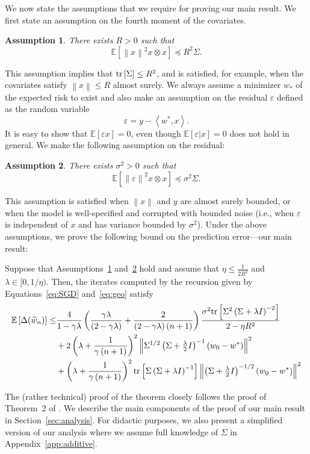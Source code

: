 \documentclass[final,12pt]{colt2018} %
\newtheorem{assumption}{Assumption}
\newcommand{\trace}[1]{\mbox{\normalfont tr}\left[#1\right]}
\newcommand{\EE}[1]{\mathbb{E}\left[#1\right]}
\newcommand{\EEcc}[2]{\mathbb{E}\left[\left.#1\right|#2\right]}
\newcommand{\norm}[1]{\left\|#1\right\|}
\newcommand{\pa}[1]{\left(#1\right)}
\newcommand{\wt}{\widetilde}
\newcommand{\tw}{\wt{w}}
\newcommand{\iprod}[2]{\left\langle#1, #2\right\rangle}
\begin{document}
We now state the assumptions that we require for proving our main result. We first state an assumption on the fourth moment of the 
covariates.
\begin{assumption}\label{ass:cov}
 There exists $R>0$ such that
 \[
  \EE{\norm{x}^2 x \otimes x} \preccurlyeq R^2\Sigma.
 \]
\end{assumption}
This assumption implies that $\trace{\Sigma} \le R^2$, and is satisfied, for example, when the covariates satisfy 
$\norm{x}\le R$ almost surely. We always assume a minimizer $w_*$ of the expected risk  to exist and  also make an assumption on the 
residual $\varepsilon$ defined as the random variable
\[
 \varepsilon = y - \iprod{w^*}{x}.
\]
It is easy to show that $\EE{\varepsilon x} = 0$, even though $\EEcc{\varepsilon}{x}=0$ does not hold in general. We make the following 
assumption on the residual:
\begin{assumption}\label{ass:res}
 There exists $\sigma^2>0$ such that
 \[
  \EE{\norm{\varepsilon}^2 x \otimes x} \preccurlyeq \sigma^2 \Sigma.
 \]
\end{assumption}
This assumption is satisfied when $\norm{x}$ and $y$ are almost surely bounded, or when the model is well-specified and corrupted with 
bounded noise (i.e., when $\varepsilon$ is independent of $x$ and has variance bounded by $\sigma^2$).
Under the above assumptions, we prove the following bound on the prediction error---our main result:
\begin{theorem}\label{thm:main}
Suppose that Assumptions~\ref{ass:cov} and~\ref{ass:res} hold and  assume that $\eta\le \frac{1}{2R^2}$ and $\lambda \in [0,1/\eta)$. Then, 
the iterates computed by the recursion given by Equations~\eqref{eq:SGD} 
and~\eqref{eq:geo} satisfy
\begin{align*}
\EE{\Delta(\tw_n)}
 \le & \frac{4}{1-\gamma\lambda} \pa{\frac{\gamma\lambda}{\pa{2-\gamma\lambda}} +
\frac{2}{\pa{2-\gamma\lambda}\pa{n+1}}} \frac{\sigma^2\trace{\Sigma^2 \pa{\Sigma + 
\lambda I}^{-2}}}{2 - \eta R^2}
\\
&+2\pa{\lambda + \frac{1}{\gamma\pa{n+1}}}^2  \norm{ \Sigma^{1/2} \pa{\Sigma + \textstyle{\frac \lambda 2}I}^{-1} \pa{w_0 - w^*}}^2
\\
&  + \pa{\lambda + \frac{1}{\gamma\pa{n+1}}}^2 \trace{\Sigma \pa{\Sigma + \lambda I}^{-1}}\norm{\pa{\Sigma + \textstyle{\frac{\lambda}{2}}
I}^{-1/2}\pa{w_0 - w^*}}^2 
\end{align*} 
\end{theorem}
The (rather technical) proof of the theorem closely follows the proof of Theorem~2 of \citet{DFB16}. We describe the main components of the 
proof of our main result in Section~\ref{sec:analysis}.  For didactic purposes, we also present a simplified version of our analysis where 
we assume full knowledge of $\Sigma$ in Appendix~\ref{app:additive}.
\end{document}
